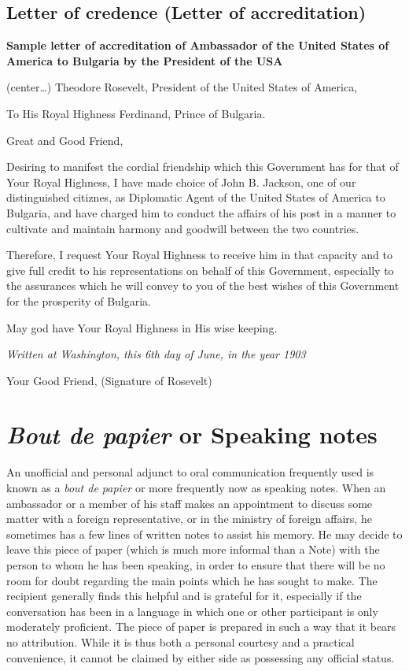 \documentclass[
  openany]{book}
\begin{document}
\hypertarget{letter-of-credence-letter-of-accreditation}{%
\subsection{Letter of credence (Letter of accreditation)}\label{letter-of-credence-letter-of-accreditation}}

\textbf{Sample letter of accreditation of Ambassador of the United States of America to Bulgaria by the President of the USA}

(center\ldots)
Theodore Rosevelt,
President of the United States of America,

To His Royal Highness
Ferdinand,
Prince of Bulgaria.

Great and Good Friend,

Desiring to manifest the cordial friendship which this Government has for that of Your Royal Highness, I have made choice of John B. Jackson, one of our distinguished citiznes, as Diplomatic Agent of the United States of America to Bulgaria, and have charged him to conduct the affairs of his post in a manner to cultivate and maintain harmony and goodwill between the two countries.

Therefore, I request Your Royal Highness to receive him in that capacity and to give full credit to his representations on behalf of this Government, especially to the assurances which he will convey to you of the best wishes of this Government for the prosperity of Bulgaria.

May god have Your Royal Highness in His wise keeping.

\emph{Written at Washington, this 6th day of June, in the year 1903}

Your Good Friend,
(Signature of Rosevelt)

\hypertarget{bout-de-papier-or-speaking-notes}{%
\section{\texorpdfstring{\emph{Bout de papier} or Speaking notes}{Bout de papier or Speaking notes}}\label{bout-de-papier-or-speaking-notes}}

An unofficial and personal adjunct to oral communication frequently used is known as a \emph{bout de papier} or more frequently now as speaking notes. When an ambassador or a member of his staff makes an appointment to discuss some matter with a foreign representative, or in the ministry of foreign affairs, he sometimes has a few lines of written notes to assist his memory. He may decide to leave this piece of paper (which is much more informal than a Note) with the person to whom he has been speaking, in order to ensure that there will be no room for doubt regarding the main points which he has sought to make. The recipient generally finds this helpful and is grateful for it, especially if the conversation has been in a language in which one or other participant is only moderately proficient. The piece of paper is prepared in such a way that it bears no attribution. While it is thus both a personal courtesy and a practical convenience, it cannot be claimed by either side as possessing any official status.
\end{document}
